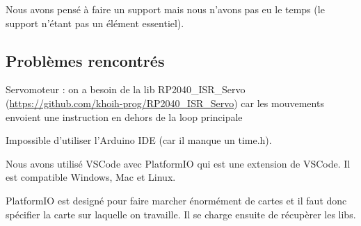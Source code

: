 Nous avons pensé à faire un support mais nous n'avons pas eu le temps (le support n'étant pas un élément essentiel).

			\subsection{Problèmes rencontrés}

Servomoteur : on a besoin de la lib RP2040\_ISR\_Servo (\url{https://github.com/khoih-prog/RP2040_ISR_Servo}) car les mouvements envoient une instruction en dehors de la loop principale

Impossible d'utiliser l'Arduino IDE (car il manque un time.h).

Nous avons utilisé VSCode avec PlatformIO qui est une extension de VSCode. Il est compatible Windows, Mac et Linux.

PlatformIO est designé pour faire marcher énormément de cartes et il faut donc spécifier la carte sur laquelle on travaille. Il se charge ensuite de récupèrer les libs.


